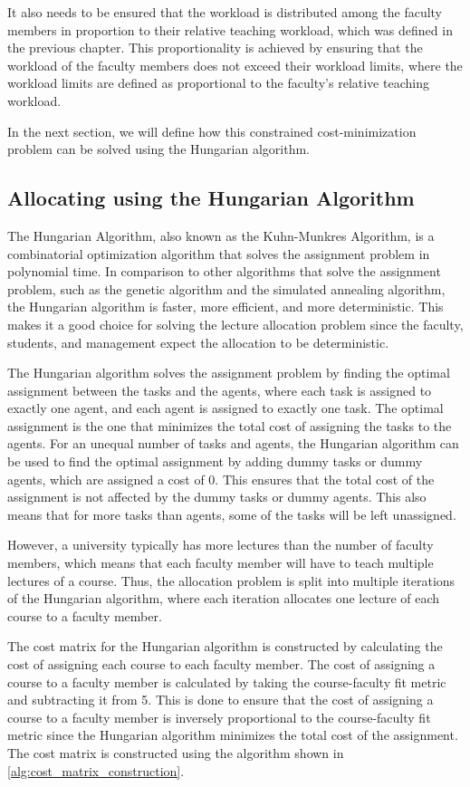 It also needs to be ensured that the workload is distributed among the faculty members in proportion to their relative teaching workload, which was defined in the previous chapter. This proportionality is achieved by ensuring that the workload of the faculty members does not exceed their workload limits, where the workload limits are defined as proportional to the faculty's relative teaching workload.

In the next section, we will define how this constrained cost-minimization problem can be solved using the Hungarian algorithm.

\subsection{Allocating using the Hungarian Algorithm}

The Hungarian Algorithm, also known as the Kuhn-Munkres Algorithm, is a combinatorial optimization algorithm that solves the assignment problem in polynomial time. In comparison to other algorithms that solve the assignment problem, such as the genetic algorithm and the simulated annealing algorithm, the Hungarian algorithm is faster, more efficient, and more deterministic. This makes it a good choice for solving the lecture allocation problem since the faculty, students, and management expect the allocation to be deterministic.

The Hungarian algorithm solves the assignment problem by finding the optimal assignment between the tasks and the agents, where each task is assigned to exactly one agent, and each agent is assigned to exactly one task. The optimal assignment is the one that minimizes the total cost of assigning the tasks to the agents. For an unequal number of tasks and agents, the Hungarian algorithm can be used to find the optimal assignment by adding dummy tasks or dummy agents, which are assigned a cost of 0. This ensures that the total cost of the assignment is not affected by the dummy tasks or dummy agents. This also means that for more tasks than agents, some of the tasks will be left unassigned.

However, a university typically has more lectures than the number of faculty members, which means that each faculty member will have to teach multiple lectures of a course. Thus, the allocation problem is split into multiple iterations of the Hungarian algorithm, where each iteration allocates one lecture of each course to a faculty member.

The cost matrix for the Hungarian algorithm is constructed by calculating the cost of assigning each course to each faculty member. The cost of assigning a course to a faculty member is calculated by taking the course-faculty fit metric and subtracting it from 5. This is done to ensure that the cost of assigning a course to a faculty member is inversely proportional to the course-faculty fit metric since the Hungarian algorithm minimizes the total cost of the assignment. The cost matrix is constructed using the algorithm shown in \autoref{alg:cost_matrix_construction}.


